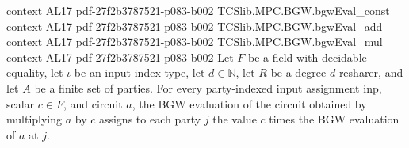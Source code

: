 \begin{theorem}
  {context}
  {AL17}
  {pdf-27f2b3787521-p083-b002}
\proofstep
  {TCSlib.MPC.BGW.bgwEval_const}
  {context}
  {AL17}
  {pdf-27f2b3787521-p083-b002}
\proofstep
  {TCSlib.MPC.BGW.bgwEval_add}
  {context}
  {AL17}
  {pdf-27f2b3787521-p083-b002}
\proofstep
  {TCSlib.MPC.BGW.bgwEval_mul}
  {context}
  {AL17}
  {pdf-27f2b3787521-p083-b002}
Let $F$ be a field with decidable equality, let $\iota$ be an input-index type, let
$d\in\mathbb N$, let $R$ be a degree-$d$ resharer, and let $A$ be a finite set of
parties. For every party-indexed input assignment $\mathrm{inp}$, scalar $c\in F$, and
circuit $a$, the BGW evaluation of the circuit obtained by multiplying $a$ by $c$
assigns to each party $j$ the value $c$ times the BGW evaluation of $a$ at $j$.
\end{theorem}

